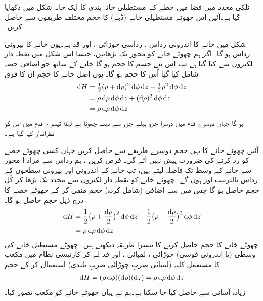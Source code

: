 نلکی محدد  میں  فضا میں خطے کے مستطیلی خانہ بندی کا   ایک خانہ  شکل  میں دکھایا گیا ہے۔آئیں اس چھوٹے مستطیلی خانے (ڈبے) کا حجم مختلف طریقوں سے حاصل کریں۔

  شکل  میں خانے کا   اندرونی رداس  ، رداسی چوڑائی ، اور قد  ہے۔یوں خانے کا بیرونی رداس  ہو گا۔ اگر ہم چھوٹے خانے کو محور  تک بڑھائیں، جیسا اس شکل میں نقطہ دار لکیروں سے کیا گیا ہے تب  اس نئے  جسم کا حجم
 ہو گا۔خانے کے ساتھ  جو اضافی حصہ شامل کیا گیا اُس کا حجم 
 ہو گا۔ یوں اصل خانے کا حجم ان کا فرق 
\begin{align*}
\dif H&=\tfrac{1}{2}(\rho+\dif \rho)^2\dif \phi \dif z-\tfrac{1}{2}\rho^2\dif\phi\dif z\\
&=\rho \dif \rho \dif\phi \dif z+(\dif\rho)^2\dif\phi\dif z\\
&=\rho \dif \rho \dif\phi \dif z
\end{align*}
ہو گا جہاں دوسرے  قدم میں  دوسرا  جزو  پہلے جزو سے بہت  چھوٹا ہے لہٰذا تیسرے قدم میں اس کو نظرانداز کیا گیا ہے۔

آئیں  چھوٹے خانے کا یہی حجم دوسرے طریقے سے حاصل کریں جہاں  کسی چھوٹے حصے کو رد کرنے کی ضرورت پیش نہیں آئے گی۔ فرض کریں ، ہم رداس   سے مراد ا محور    سے   خانے کے وسط تک فاصلہ لیتے ہیں،  تب خانے کے اندرونی اور بیرونی سطحوں کے رداس  بالترتیب  اور  ہوں گے۔  چھوٹے   خانے کو نقطہ دار لکیروں سے    محدد تک بڑھا کر    کُل حجم 
 حاصل ہو گا جس میں  سے اضافی (شامل کردہ) حجم  
 منفی کر کے چھوٹے حصے  کا  درج ذیل حجم حاصل ہو گا۔
\begin {align*}
\dif H &=\frac{1}{2}\big(\rho+\frac{\dif \rho}{2}\big)^2\dif\phi\dif z-\frac{1}{2}\big(\rho-\frac{\dif \rho}{2}\big)^2\dif\phi\dif z \\
&= \rho \dif \rho \dif \phi\dif z
\end {align*}
چھوٹے خانے کا حجم حاصل  کرنے کا تیسرا طریقہ دیکھتے ہیں۔ چھوٹے  مستطیل  خانے کی وسطی (یا اندرونی قوسی) چوڑائی ، لمبائی ،  اور قد  لے  کر کارتیسی نظام میں مکعب  کا  مستعمل کلیہ (لمبائی ضربِ چوڑائی ضربِ بلندی) استعمال کر کے حجم
\begin{align*}
\dif H=(\rho\dif\phi)(\dif\rho)(\dif z)=\rho\dif \rho\dif\phi \dif z
\end{align*}
زیادہ  آسانی سے حاصل کیا جا سکتا ہے۔ہم نے یہاں چھوٹے خانے کو  مکعب تصور کیا۔

